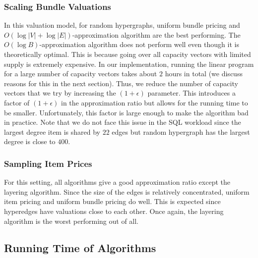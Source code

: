  \subsubsection{Scaling Bundle Valuations} In this valuation model, for random hypergraphs, uniform bundle pricing and $O(\log |V|+\log |E|)$-approximation algorithm are the best performing. The $O(\log B)$-approximation algorithm does not perform well even though it is theoretically optimal. This is because going over all capacity vectors with limited supply is extremely expensive. In our implementation, running the linear program for a large number of capacity vectors takes about $2$ hours in total (we discuss reasons for this in the next section). Thus, we reduce the number of capacity vectors that we try by increasing the $(1+\epsilon)$ parameter. This introduces a factor of $(1+\epsilon)$ in the approximation ratio but allows for the running time to be smaller. Unfortunately, this factor is large enough to make the algorithm bad in practice. Note that we do not face this issue in the SQL workload since the largest degree item is shared by $22$ edges but random hypergraph has the largest degree is close to $400$.
 
 \subsubsection{Sampling Item Prices} For this setting, all algorithms give a good approximation ratio except the layering algorithm. Since the size of the edges is relatively concentrated, uniform item pricing and uniform bundle pricing do well. This is expected since hyperedges have valuations close to each other. Once again, the layering algorithm is the worst performing out of all.
 
 
 \subsection{Running Time of Algorithms}
 
